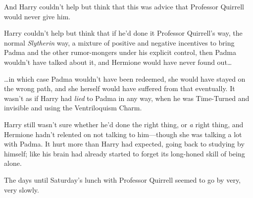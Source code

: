 And Harry couldn't help but think that this was advice that Professor Quirrell
would never give him.

Harry couldn't help but think that if he'd done it Professor Quirrell's way,
the normal \emph{Slytherin} way, a mixture of positive and negative incentives
to bring Padma and the other rumor-mongers under his explicit control, then
Padma wouldn't have talked about it, and Hermione would have never found
out{\ldots}

{\ldots}in which case Padma wouldn't have been redeemed, she would have stayed
on the wrong path, and she herself would have suffered from that eventually. It
wasn't as if Harry had \emph{lied} to Padma in any way, when he was Time-Turned
and invisible and using the Ventriloquism Charm.

Harry still wasn't sure whether he'd done the right thing, or \emph{a} right
thing, and Hermione hadn't relented on not talking to him---though she was
talking a lot with Padma. It hurt more than Harry had expected, going back to
studying by himself; like his brain had already started to forget its
long-honed skill of being alone.

The days until Saturday's lunch with Professor Quirrell seemed to go by very,
very slowly.
